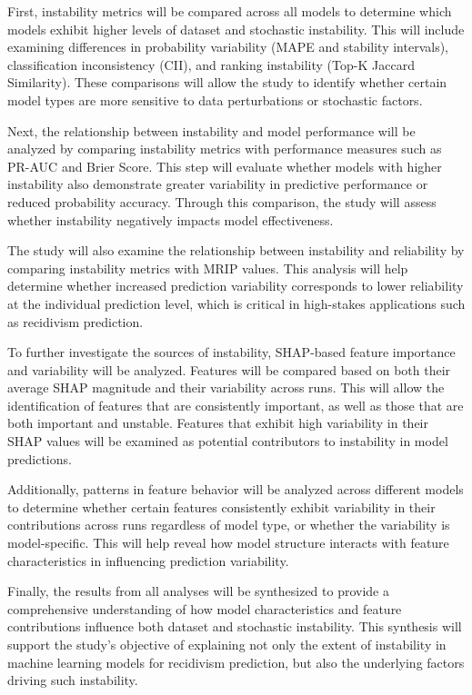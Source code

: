 \documentclass{article}
\begin{document}
\begin{enumerate}
  First, instability metrics will be compared across all models to determine which models exhibit higher levels of dataset and stochastic instability. This will include examining differences in probability variability (MAPE and stability intervals), classification inconsistency (CII), and ranking instability (Top-K Jaccard Similarity). These comparisons will allow the study to identify whether certain model types are more sensitive to data perturbations or stochastic factors.

  Next, the relationship between instability and model performance will be analyzed by comparing instability metrics with performance measures such as PR-AUC and Brier Score. This step will evaluate whether models with higher instability also demonstrate greater variability in predictive performance or reduced probability accuracy. Through this comparison, the study will assess whether instability negatively impacts model effectiveness.

  The study will also examine the relationship between instability and reliability by comparing instability metrics with MRIP values. This analysis will help determine whether increased prediction variability corresponds to lower reliability at the individual prediction level, which is critical in high-stakes applications such as recidivism prediction.

  To further investigate the sources of instability, SHAP-based feature importance and variability will be analyzed. Features will be compared based on both their average SHAP magnitude and their variability across runs. This will allow the identification of features that are consistently important, as well as those that are both important and unstable. Features that exhibit high variability in their SHAP values will be examined as potential contributors to instability in model predictions.

  Additionally, patterns in feature behavior will be analyzed across different models to determine whether certain features consistently exhibit variability in their contributions across runs regardless of model type, or whether the variability is model-specific. This will help reveal how model structure interacts with feature characteristics in influencing prediction variability.

  Finally, the results from all analyses will be synthesized to provide a comprehensive understanding of how model characteristics and feature contributions influence both dataset and stochastic instability. This synthesis will support the study's objective of explaining not only the extent of instability in machine learning models for recidivism prediction, but also the underlying factors driving such instability.
\end{enumerate}
\end{document}
